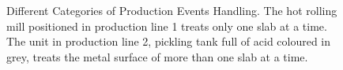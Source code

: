  \begin{figure}[!ht]
	\begin{center}
		\caption{Different Categories of Production Events Handling. The hot rolling mill positioned in production line 1 treats only one slab at a time. The unit in production line 2, pickling tank full of acid coloured in grey, treats the metal surface of more than one slab at a time.
		}
		\label{figure-hypothetical_constraints}
	\end{center}
\end{figure}